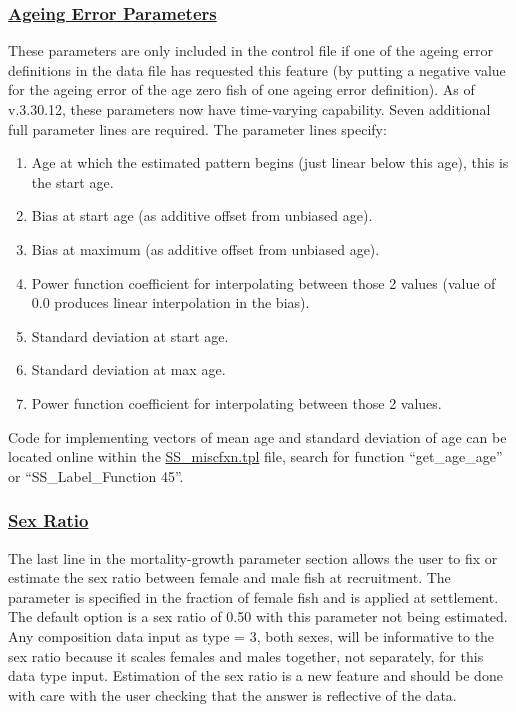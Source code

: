 \hypertarget{AgeErrorParam}{}
\subsubsection[Ageing Error Parameters]{\protect\hyperlink{AgeErrorParam}{Ageing Error Parameters}}
These parameters are only included in the control file if one of the ageing error definitions in the data file has requested this feature (by putting a negative value for the ageing error of the age zero fish of one ageing error definition). As of v.3.30.12, these parameters now have time-varying capability. Seven additional full parameter lines are required. The parameter lines specify:
\begin{enumerate}
	\item Age at which the estimated pattern begins (just linear below this age), this is the start age.
	\item Bias at start age (as additive offset from unbiased age).
	\item Bias at maximum (as additive offset from unbiased age).
	\item Power function coefficient for interpolating between those 2 values (value of 0.0 produces linear interpolation in the bias).
	\item Standard deviation at start age.
	\item Standard deviation at max age.
	\item Power function coefficient for interpolating between those 2 values.
\end{enumerate}

\noindent Code for implementing vectors of mean age and standard deviation of age can be located online within the \href{https://github.com/nmfs-ost/ss3-source-code/blob/main/SS_miscfxn.tpl}{SS\_miscfxn.tpl} file, search for function ``get\_age\_age'' or ``SS\_Label\_Function 45''.

\hypertarget{SexRatio}{}
\subsubsection[Sex Ratio]{\protect\hyperlink{SexRatio}{Sex Ratio}}
The last line in the mortality-growth parameter section allows the user to fix or estimate the sex ratio between female and male fish at recruitment. The parameter is specified in the fraction of female fish and is applied at settlement. The default option is a sex ratio of 0.50 with this parameter not being estimated. Any composition data input as type = 3, both sexes, will be informative to the sex ratio because it scales females and males together, not separately, for this data type input. Estimation of the sex ratio is a new feature and should be done with care with the user checking that the answer is reflective of the data.

